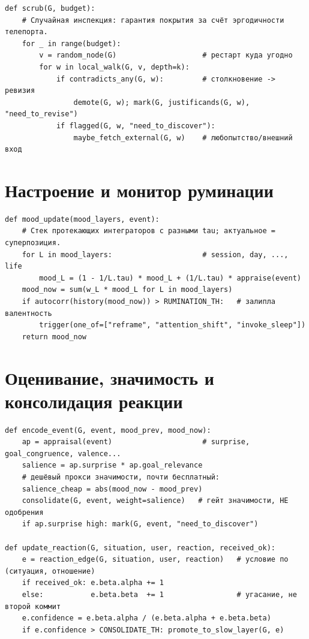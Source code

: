 \begin{lstlisting}[style=pseudo]
def scrub(G, budget):
    # Случайная инспекция: гарантия покрытия за счёт эргодичности телепорта.
    for _ in range(budget):
        v = random_node(G)                    # рестарт куда угодно
        for w in local_walk(G, v, depth=k):
            if contradicts_any(G, w):         # столкновение -> ревизия
                demote(G, w); mark(G, justificands(G, w), "need_to_revise")
            if flagged(G, w, "need_to_discover"):
                maybe_fetch_external(G, w)    # любопытство/внешний вход
\end{lstlisting}

\section{Настроение и монитор руминации}

\begin{lstlisting}[style=pseudo]
def mood_update(mood_layers, event):
    # Стек протекающих интеграторов с разными tau; актуальное = суперпозиция.
    for L in mood_layers:                     # session, day, ..., life
        mood_L = (1 - 1/L.tau) * mood_L + (1/L.tau) * appraise(event)
    mood_now = sum(w_L * mood_L for L in mood_layers)
    if autocorr(history(mood_now)) > RUMINATION_TH:   # залипла валентность
        trigger(one_of=["reframe", "attention_shift", "invoke_sleep"])
    return mood_now
\end{lstlisting}

\section{Оценивание, значимость и консолидация реакции}

\begin{lstlisting}[style=pseudo]
def encode_event(G, event, mood_prev, mood_now):
    ap = appraisal(event)                     # surprise, goal_congruence, valence...
    salience = ap.surprise * ap.goal_relevance
    # дешёвый прокси значимости, почти бесплатный:
    salience_cheap = abs(mood_now - mood_prev)
    consolidate(G, event, weight=salience)   # гейт значимости, НЕ одобрения
    if ap.surprise high: mark(G, event, "need_to_discover")

def update_reaction(G, situation, user, reaction, received_ok):
    e = reaction_edge(G, situation, user, reaction)   # условие по (ситуация, отношение)
    if received_ok: e.beta.alpha += 1
    else:           e.beta.beta  += 1                 # угасание, не второй коммит
    e.confidence = e.beta.alpha / (e.beta.alpha + e.beta.beta)
    if e.confidence > CONSOLIDATE_TH: promote_to_slow_layer(G, e)
\end{lstlisting}

